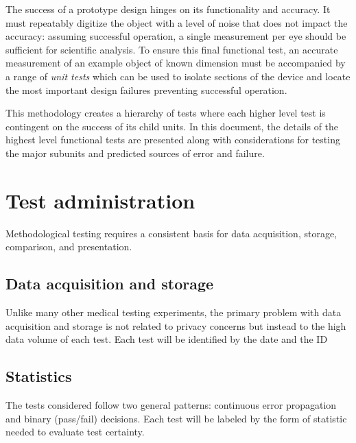 \documentclass{article}
\begin{document}
The success of a prototype design hinges on its functionality and accuracy. It must repeatably digitize the object with a level of noise that does not impact the accuracy: assuming successful operation, a single measurement per eye should  be sufficient for scientific analysis. To ensure this final functional test, an accurate measurement of an example object of known dimension must be accompanied by a range of \textit{unit tests} which can be used to isolate sections of the device and locate the most important design failures preventing successful operation.

This methodology creates a hierarchy of tests where each higher level test is contingent on the success of its child units. In this document, the details of the highest level functional tests are presented along with considerations for testing the major subunits and predicted sources of error and failure.

\section{Test administration}
\label{sec:test-administration}

Methodological testing requires a consistent basis for data acquisition, storage, comparison, and presentation.

\subsection{Data acquisition and storage}
\label{sec:data-acqu-stor}

Unlike many other medical testing experiments, the primary problem with data acquisition and storage is not related to privacy concerns but instead to the high data volume of each test. Each test will be identified by the date and the ID %

\subsection{Statistics}
\label{sec:statistics}

The tests considered follow two general patterns: continuous error
propagation and binary (pass/fail) decisions. Each test will be
labeled by the form of statistic needed to evaluate test certainty.
\end{document}
